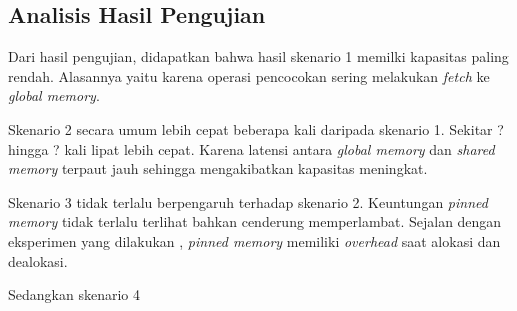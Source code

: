       

  \subsection{Analisis Hasil Pengujian}
    
    Dari hasil pengujian, didapatkan bahwa hasil skenario 1 memilki kapasitas paling rendah. Alasannya yaitu karena operasi pencocokan sering melakukan \emph{fetch} ke \emph{global memory}. 
    
    Skenario 2 secara umum lebih cepat beberapa kali daripada skenario 1. Sekitar ? hingga ? kali lipat lebih cepat. Karena latensi antara \emph{global memory} dan \emph{shared memory} terpaut jauh sehingga mengakibatkan kapasitas meningkat.

    Skenario 3 tidak terlalu berpengaruh terhadap skenario 2. Keuntungan \emph{pinned memory} tidak terlalu terlihat bahkan cenderung memperlambat. Sejalan dengan eksperimen yang dilakukan \cite{gnort2008}, \emph{pinned memory} memiliki \emph{overhead} saat alokasi dan dealokasi.

    Sedangkan skenario 4 